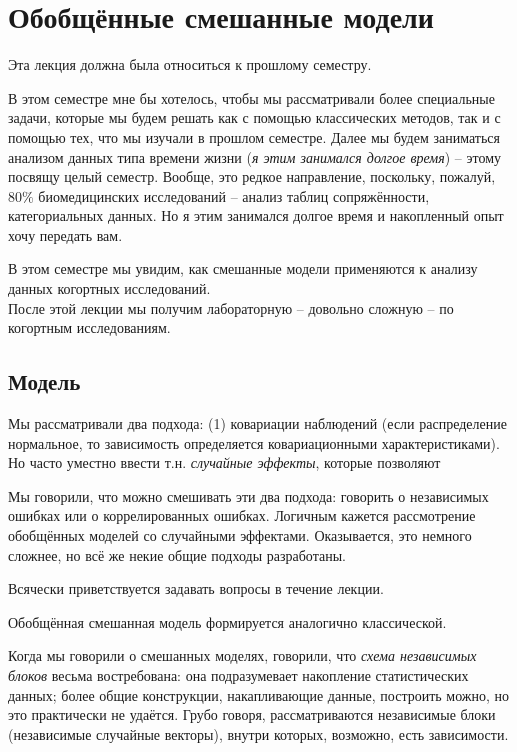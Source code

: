\documentclass[main.tex]{subfiles}
\begin{document}
\section{Обобщённые смешанные модели}
Эта лекция должна была относиться к прошлому семестру.

В этом семестре мне бы хотелось, чтобы мы рассматривали более специальные задачи, которые мы будем решать как с помощью классических методов, так и с помощью тех, что мы изучали в прошлом семестре.
Далее мы будем заниматься анализом данных типа времени жизни (\emph{я этим занимался долгое время}) -- этому посвящу целый семестр.
Вообще, это редкое направление, поскольку, пожалуй, $ 80\% $ биомедицинских исследований -- анализ таблиц сопряжённости, категориальных данных.
Но я этим занимался долгое время и накопленный опыт хочу передать вам.

В этом семестре мы увидим, как смешанные модели применяются к анализу данных когортных исследований. \\

После этой лекции мы получим лабораторную -- довольно сложную -- по когортным исследованиям.

\subsection{Модель}

Мы рассматривали два подхода: (1) ковариации наблюдений (если распределение нормальное, то зависимость определяется ковариационными характеристиками).
Но часто уместно ввести т.н. \emph{случайные эффекты}, которые позволяют

Мы говорили, что можно смешивать эти два подхода: говорить о независимых ошибках или о коррелированных ошибках.
Логичным кажется рассмотрение обобщённых моделей со случайными эффектами.
Оказывается, это немного сложнее, но всё же некие общие подходы разработаны.

\begin{leftbar}
	Всячески приветствуется задавать вопросы в течение лекции.
\end{leftbar}

Обобщённая смешанная модель формируется аналогично классической.

Когда мы говорили о смешанных моделях, говорили, что \emph{схема независимых блоков} весьма востребована: она подразумевает накопление статистических данных; более общие конструкции, накапливающие данные, построить можно, но это практически не удаётся.
Грубо говоря, рассматриваются независимые блоки (независимые случайные векторы), внутри которых, возможно, есть зависимости.
\end{document}
